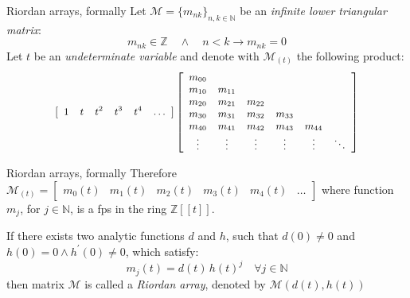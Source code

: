 \documentclass[10pt,serif, professionalfont]{beamer}
\begin{document}
\begin{frame}{Riordan arrays, formally}
    Let $\mathcal{M}=\lbrace m_{nk}\rbrace_{n,k\in\mathbb{N}}$ be an \emph{infinite
    lower triangular matrix}:
    \begin{displaymath}
         m_{nk}\in\mathbb{Z} \quad\wedge\quad n < k \rightarrow m_{nk} = 0
    \end{displaymath}
    Let $t$ be an \emph{undeterminate variable} and denote with 
    $\mathcal{M}_{(t)}$ the following product: 
    \begin{displaymath}
        \small
        \left[
            \begin{array}{cccccc}
                1 & t & t^{2} & t^{3} & t^{4} &\ldots
            \end{array}
        \right]
        \left[
            \begin{array}{cccccc}
                m_{00} & & & &  &\\
                m_{10} & m_{11} & & &  &\\
                m_{20} & m_{21}& m_{22}& &  &\\
                m_{30} & m_{31}& m_{32}& m_{33}&  &\\
                m_{40} & m_{41}& m_{42}& m_{43}& m_{44} &\\
                \vdots & \vdots& \vdots& \vdots& \vdots & \ddots\\
            \end{array}
        \right]
    \end{displaymath}
\end{frame}

\begin{frame}{Riordan arrays, formally}
    Therefore $\mathcal{M}_{(t)} =
        \left[
            \begin{array}{cccccc}
                m_{0}(t) & m_{1}(t) & m_{2}(t) & m_{3}(t) &m_{4}(t) & \ldots
            \end{array}
        \right]$ 
    where function $m_{j}$, for $j\in\mathbb{N}$, is a {fps} in the ring 
    $\mathbb{Z}[\![t]\!]$.
    
    \begin{definition}
        If there exists two analytic functions $d$
        and $h$, such that $d(0)\neq0$ and $h(0)=0 \wedge h^{\prime}(0)\neq0$, which
        satisfy:
        \begin{displaymath}
            m_{j}(t)=d(t)\,h(t)^{j} \quad \forall j\in\mathbb{N}
        \end{displaymath}
        then matrix $\mathcal{M}$ is called a \emph{Riordan array}, denoted by 
        $\mathcal{M}(d(t),h(t))$ 
    \end{definition}
\end{frame}
\end{document}
